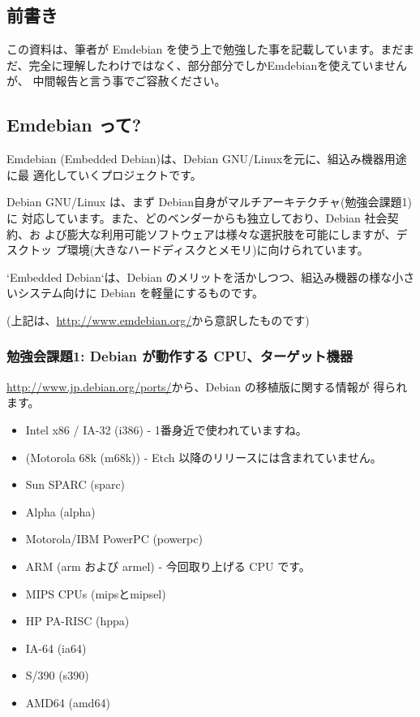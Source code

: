 \documentclass[mingoth,a4paper]{jsarticle}
\begin{document}

\subsection{前書き}

この資料は、筆者が Emdebian を使う上で勉強した事を記載しています。まだま
だ、完全に理解したわけではなく、部分部分でしかEmdebianを使えていませんが、
中間報告と言う事でご容赦ください。

\subsection{Emdebian って?}

Emdebian (Embedded Debian)は、Debian GNU/Linuxを元に、組込み機器用途に最
適化していくプロジェクトです。

Debian GNU/Linux は、まず Debian自身がマルチアーキテクチャ(勉強会課題1)に
対応しています。また、どのベンダーからも独立しており、Debian 社会契約、お
よび膨大な利用可能ソフトウェアは様々な選択肢を可能にしますが、デスクトッ
プ環境(大きなハードディスクとメモリ)に向けられています。

`Embedded Debian`は、Debian のメリットを活かしつつ、組込み機器の様な小さ
いシステム向けに Debian を軽量にするものです。

(上記は、\url{http://www.emdebian.org/}から意訳したものです)

\subsubsection{勉強会課題1: Debian が動作する CPU、ターゲット機器}

\url{http://www.jp.debian.org/ports/}から、Debian の移植版に関する情報が
得られます。

\begin{itemize}
 
 \item Intel x86 / IA-32 (i386) - 1番身近で使われていますね。 
 \item (Motorola 68k (m68k)) - Etch 以降のリリースには含まれていません。
 \item  Sun SPARC (sparc)

 \item  Alpha (alpha)
 \item  Motorola/IBM PowerPC (powerpc)
 \item  ARM (arm および armel) - 今回取り上げる CPU です。
 \item  MIPS CPUs (mipsとmipsel)
 \item  HP PA-RISC (hppa)
 \item  IA-64 (ia64)
 \item  S/390 (s390)
 \item  AMD64 (amd64)
\end{itemize}
\end{document}
